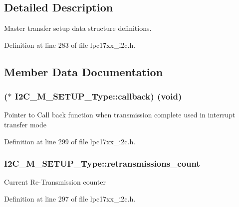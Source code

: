 \subsection{Detailed Description}
Master transfer setup data structure definitions. 

Definition at line 283 of file lpc17xx\+\_\+i2c.\+h.



\subsection{Member Data Documentation}
\subsubsection[{\texorpdfstring{callback}{callback}}]{($\ast$ I2\+C\+\_\+\+M\+\_\+\+S\+E\+T\+U\+P\+\_\+\+Type\+::callback) ({\bf void})}\hypertarget{struct_i2_c___m___s_e_t_u_p___type_a868ab673eca0bfb0a49175ac01d5b5d0}{}\label{struct_i2_c___m___s_e_t_u_p___type_a868ab673eca0bfb0a49175ac01d5b5d0}
Pointer to Call back function when transmission complete used in interrupt transfer mode 

Definition at line 299 of file lpc17xx\+\_\+i2c.\+h.

\subsubsection[{\texorpdfstring{retransmissions\+\_\+count}{retransmissions_count}}]{ I2\+C\+\_\+\+M\+\_\+\+S\+E\+T\+U\+P\+\_\+\+Type\+::retransmissions\+\_\+count}\hypertarget{struct_i2_c___m___s_e_t_u_p___type_aa6840f872e22a72e9f916a490ecd1248}{}\label{struct_i2_c___m___s_e_t_u_p___type_aa6840f872e22a72e9f916a490ecd1248}
Current Re-\/\+Transmission counter 

Definition at line 297 of file lpc17xx\+\_\+i2c.\+h.

